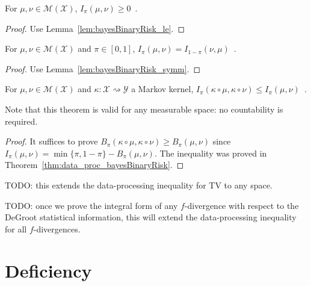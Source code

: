 \begin{lemma}
  \label{lem:deGrootInfo_nonneg}
  For $\mu, \nu \in \mathcal M(\mathcal X)$, $I_\pi(\mu, \nu) \ge 0$~.
\end{lemma}

\begin{proof}%
{}
Use Lemma~\ref{lem:bayesBinaryRisk_le}.
\end{proof}

\begin{lemma}
  \label{lem:deGrootInfo_symm}
  For $\mu, \nu \in \mathcal M(\mathcal X)$ and $\pi \in [0,1]$, $I_\pi(\mu, \nu) = I_{1 - \pi}(\nu, \mu)$~.
\end{lemma}

\begin{proof}%
{}
Use Lemma~\ref{lem:bayesBinaryRisk_symm}.
\end{proof}

\begin{theorem}
  \label{thm:data_proc_deGrootInfo}
  \leanok
  For $\mu, \nu \in \mathcal M(\mathcal X)$ and $\kappa : \mathcal X \rightsquigarrow \mathcal Y$ a Markov kernel, $I_\pi(\kappa \circ \mu, \kappa \circ \nu) \le I_\pi(\mu, \nu)$~.
\end{theorem}

Note that this theorem is valid for any measurable space: no countability is required.

\begin{proof}\leanok
{}
It suffices to prove $B_\pi(\kappa \circ \mu, \kappa \circ \nu) \ge B_\pi(\mu, \nu)$ since $I_\pi(\mu, \nu) = \min\{\pi, 1 - \pi\} - B_\pi(\mu, \nu)$.
The inequality was proved in Theorem~\ref{thm:data_proc_bayesBinaryRisk}.
\end{proof}

TODO: this extends the data-processing inequality for TV to any space.

TODO: once we prove the integral form of any $f$-divergence with respect to the DeGroot statistical information, this will extend the data-processing inequality for all $f$-divergences. 

\section{Deficiency}

